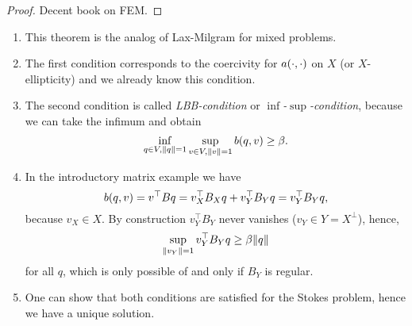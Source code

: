 \begin{proof}
	Decent book on FEM.
\end{proof}

\begin{remark}
	\begin{enumerate}
		\item This theorem is the analog of Lax-Milgram for mixed problems.
		\item The first condition corresponds to the coercivity for \(a\parentheses*{\cdot, \cdot}\) on \(X\) (or \(X\)-ellipticity) and we already know this condition.
		\item The second condition is called \emph{LBB-condition} or \emph{\(\inf\)-\(\sup\)-condition}, because we can take the infimum and obtain
		\[
			\inf_{q \in V, \norm*{q} = 1}\sup_{v \in V, \norm*{v} = 1}b\parentheses*{q, v} \ge \beta.
		\]
		\item In the introductory matrix example we have
		\[
			b\parentheses*{q, v} = v^\top Bq = v_X^\top B_X q + v_Y^\top B_Y q = v_Y^\top B_Y q,
		\]
		because \(v_X \in X\).
		By construction \(v_Y^\top B_Y\) never vanishes (\(v_Y \in Y = X^\bot\)), hence,
		\[
			\sup_{\norm*{v_Y} = 1} v_Y^\top B_Y q \ge \beta\norm*{q}
		\]
		for all \(q\), which is only possible of and only if \(B_Y\) is regular.
		\item One can show that both conditions are satisfied for the Stokes problem, hence we have a unique solution.
	\end{enumerate}
\end{remark}
